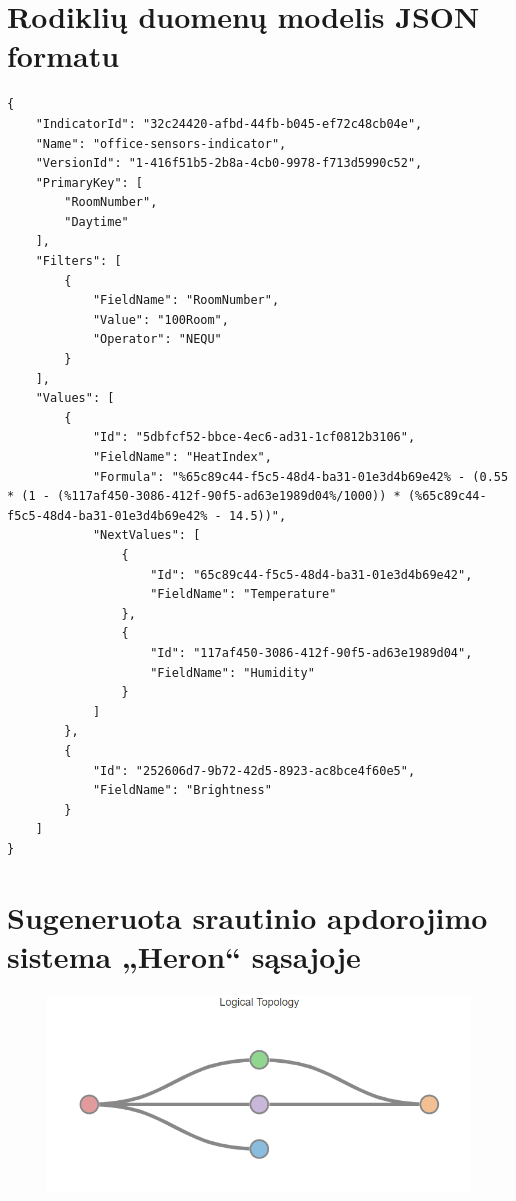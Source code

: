 \documentclass{VUMIFPSbakalaurinis}
\begin{document}
\section{Rodiklių duomenų modelis JSON formatu}\label{add:initial-json}
\begin{lstlisting}
{
    "IndicatorId": "32c24420-afbd-44fb-b045-ef72c48cb04e",
    "Name": "office-sensors-indicator",
    "VersionId": "1-416f51b5-2b8a-4cb0-9978-f713d5990c52",
    "PrimaryKey": [
        "RoomNumber",
        "Daytime"
    ],
    "Filters": [
        {
            "FieldName": "RoomNumber",
            "Value": "100Room",
            "Operator": "NEQU"
        }
    ],
    "Values": [
        {
            "Id": "5dbfcf52-bbce-4ec6-ad31-1cf0812b3106",
            "FieldName": "HeatIndex",
            "Formula": "%65c89c44-f5c5-48d4-ba31-01e3d4b69e42% - (0.55 * (1 - (%117af450-3086-412f-90f5-ad63e1989d04%/1000)) * (%65c89c44-f5c5-48d4-ba31-01e3d4b69e42% - 14.5))",
            "NextValues": [
                {
                    "Id": "65c89c44-f5c5-48d4-ba31-01e3d4b69e42",
                    "FieldName": "Temperature"
                },
                {
                    "Id": "117af450-3086-412f-90f5-ad63e1989d04",
                    "FieldName": "Humidity"
                }
            ]
        },
        {
            "Id": "252606d7-9b72-42d5-8923-ac8bce4f60e5",
            "FieldName": "Brightness"
        }
    ]
}
\end{lstlisting}

\section{Sugeneruota srautinio apdorojimo sistema „Heron“ sąsajoje}\label{add:generated-system1}
\begin{figure}[H]
    \centering
    \includegraphics[width=1\textwidth]{img/generated-topology-1.png}
    \label{img:generated-data}
\end{figure}
\end{document}
